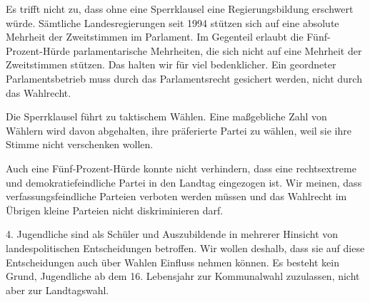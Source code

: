 Es trifft nicht zu, dass ohne eine Sperrklausel eine Regierungsbildung erschwert würde. Sämtliche Landesregierungen seit 1994 stützen sich auf eine absolute Mehrheit der Zweitstimmen im Parlament. Im Gegenteil erlaubt die Fünf-Prozent-Hürde parlamentarische Mehrheiten, die sich nicht auf eine Mehrheit der Zweitstimmen stützen. Das halten wir für viel bedenklicher. Ein geordneter Parlamentsbetrieb muss durch das Parlamentsrecht gesichert werden, nicht durch das Wahlrecht.

Die Sperrklausel führt zu taktischem Wählen. Eine maßgebliche Zahl von Wählern wird davon abgehalten, ihre präferierte Partei zu wählen, weil sie ihre Stimme nicht verschenken wollen.

Auch eine Fünf-Prozent-Hürde konnte nicht verhindern, dass eine rechtsextreme und demokratiefeindliche Partei in den Landtag eingezogen ist. Wir meinen, dass verfassungsfeindliche Parteien verboten werden müssen und das Wahlrecht im Übrigen kleine Parteien nicht diskriminieren darf.

4. Jugendliche sind als Schüler und Auszubildende in mehrerer Hinsicht von landespolitischen Entscheidungen betroffen. Wir wollen deshalb, dass sie auf diese Entscheidungen auch über Wahlen Einfluss nehmen können. Es besteht kein Grund, Jugendliche ab dem 16. Lebensjahr zur Kommunalwahl zuzulassen, nicht aber zur Landtagswahl.
